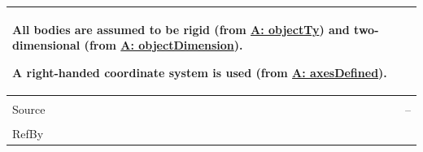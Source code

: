 \documentclass[12pt]{article}
\begin{document}
\begin{minipage}{\textwidth}
\begin{tabular}{>{\raggedright}p{}>{\raggedright\arraybackslash}p{}}
        All bodies are assumed to be rigid (from \hyperref[assumpOT]{A: objectTy}) and two-dimensional (from \hyperref[assumpOD]{A: objectDimension}).
        
        A right-handed coordinate system is used (from \hyperref[assumpAD]{A: axesDefined}).
        
\\ \midrule \\
Source & --
         
\\ \midrule \\
RefBy & 
\\ \bottomrule
\end{tabular}
\end{minipage}

\vspace{\baselineskip}
\noindent
\end{document}
